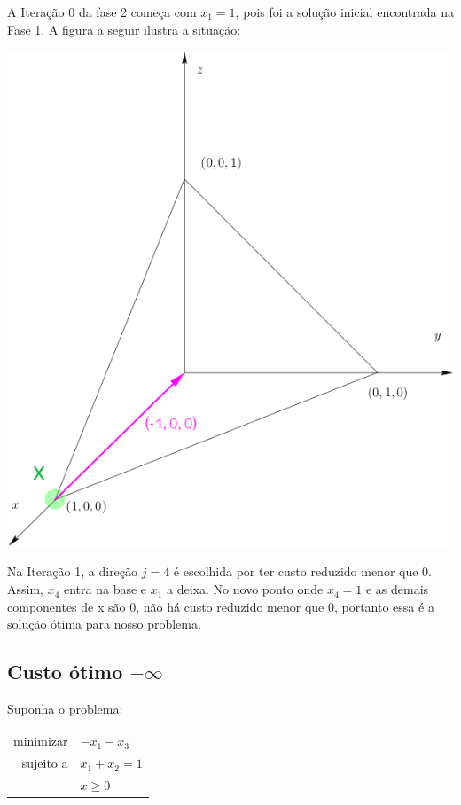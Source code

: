 \documentclass[12pt]{article}
\begin{document}
	A Iteração 0 da fase 2 começa com $x_1 = 1$, pois foi a solução inicial encontrada na Fase 1. A figura a seguir ilustra a situação:
	
	\begin{center}
	\includegraphics[scale=0.6]{xyz2}	
	\end{center}
	
	Na Iteração 1, a direção $j = 4$ é escolhida por ter custo reduzido menor que 0. Assim, $x_4$ entra na base e $x_1$ a deixa. No novo ponto onde $x_4 = 1$ e as demais componentes de x são 0, não há custo reduzido menor que 0, portanto essa é a solução ótima para nosso problema.
	
	\subsection{Custo ótimo $-\infty$}
	Suponha o problema:
	\begin{center}	
    	\begin{tabular}{r l}
	  		minimizar & $-x_1 - x_3$ \\
        
        	sujeito a & $x_1 + x_2 = 1$ \\
            & $x \geq 0$ \\
        \end{tabular}
    \end{center}
    
\end{document}
